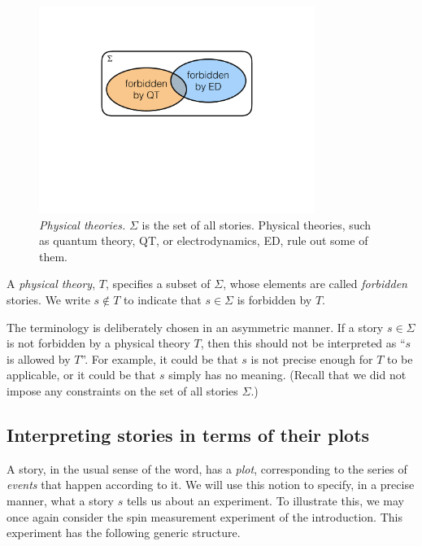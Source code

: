 \documentclass[12pt]{article}
\theoremstyle{plain}
\theoremstyle{definition}
\begin{document}
\begin{figure}[t]
\centering
\includegraphics[trim= 0.4cm  12.5cm 0cm 5.5cm, clip=true, width=0.8\textwidth]{Theories.pdf}
\caption{\emph{Physical theories.}  $\Sigma$ is the set of all stories. Physical theories, such as quantum theory, QT, or electrodynamics, ED, rule out some of them. 
\label{fig_theories}
}
\end{figure}
  
 \begin{shaded}
 \noindent A \emph{physical theory}, $T$, specifies a subset of $\Sigma$, whose elements are called \emph{forbidden} stories. We write $s \notin T$ to indicate that $s \in \Sigma$ is forbidden by $T$.
\end{shaded}

The terminology is deliberately chosen in an asymmetric manner.   If a story $s \in \Sigma$ is not forbidden by a physical theory $T$, then this should not be interpreted as ``$s$ is allowed by $T$''.  For example, it could be that $s$ is not precise enough for $T$ to be applicable, or it could be that $s$  simply has no meaning. (Recall that we did not impose any constraints on the set of all stories $\Sigma$.)

\subsection{Interpreting stories in terms of their plots} \label{sec_plots}

A story, in the usual sense of the word, has a \emph{plot}, corresponding to the series of \emph{events} that happen according to it.  We will use this notion to specify, in a precise manner, what a story $s$ tells us about an experiment. To illustrate this, we may once again consider the spin measurement experiment of the introduction. This experiment has the following generic structure. 
\end{document}
